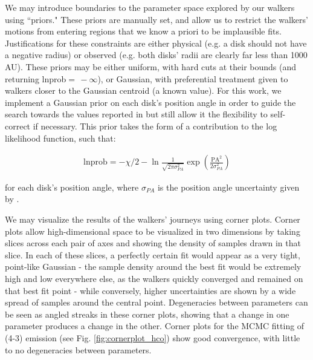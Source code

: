 We may introduce boundaries to the parameter space explored by our walkers using ``priors." These priors are manually set, and allow us to restrict the walkers' motions from entering regions that we know a priori to be implausible fits. Justifications for these constraints are either physical (e.g. a disk should not have a negative radius) or observed (e.g. both disks' radii are clearly far less than 1000 AU). These priors may be either uniform, with hard cuts at their bounds (and returning lnprob$ =\,-\infty$), or Gaussian, with preferential treatment given to walkers closer to the Gaussian centroid (a known value). For this work, we implement a Gaussian prior on each disk's position angle in order to guide the search towards the values reported in \citet{Williams2014} but still allow it the flexibility to self-correct if necessary. This prior takes the form of a contribution to the log likelihood function, such that:

\begin{align}
  \text{lnprob} = -\chi/2  -\ln{\frac{1}{\sqrt{2 \pi \sigma_{PA}^2}}} \exp{\left(\frac{\text{PA}^2}{2 \sigma_{PA}^2}\right)}
\end{align}

\noindent
for each disk's position angle, where $\sigma_{PA}$ is the position angle uncertainty given by \citet{Williams2014}.



We may visualize the results of the walkers' journeys using corner plots. Corner plots allow high-dimensional space to be visualized in two dimensions by taking slices across each pair of axes and showing the density of samples drawn in that slice. In each of these slices, a perfectly certain fit would appear as a very tight, point-like Gaussian - the sample density around the best fit would be extremely high and low everywhere else, as the walkers quickly converged and remained on that best fit point - while conversely, higher uncertainties are shown by a wide spread of samples around the central point. Degeneracies between parameters can be seen as angled streaks in these corner plots, showing that a change in one parameter produces a change in the other. Corner plots for the MCMC fitting of \hco(4-3) emission (see Fig. \ref{fig:cornerplot_hco}) show good convergence, with little to no degeneracies between parameters.


